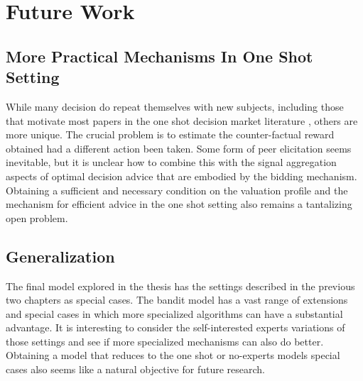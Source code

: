 
\section{Future Work} \label{sec:future}
\subsection{More Practical Mechanisms In One Shot Setting}

While many decision do repeat themselves with new subjects, including those that motivate most papers in the one shot decision market literature , others are more unique. 
The crucial problem is to estimate the counter-factual reward obtained had a different action been taken.
Some form of peer elicitation seems inevitable, but it is unclear how to combine this with the signal aggregation aspects of optimal decision advice that are embodied by the bidding mechanism. 
Obtaining a sufficient and necessary condition on the valuation profile and the mechanism for efficient advice in the one shot setting also remains a tantalizing open problem.

\subsection{Generalization}

The final model explored in the thesis has the settings described in the previous two chapters as special cases.
The bandit model has a vast range of extensions and special cases in which more specialized algorithms can have a  substantial advantage. It is interesting to consider the self-interested experts variations of those settings and see if more specialized mechanisms can also do better.
Obtaining a model that reduces to the one shot or no-experts models special cases also seems like a natural objective for future research. 

